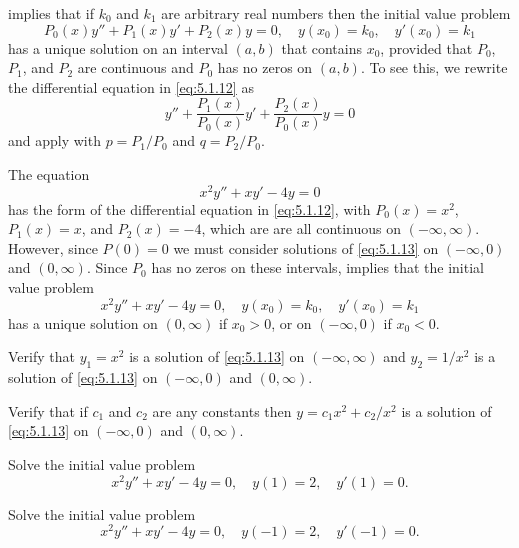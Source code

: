  implies that if $k_0$ and $k_1$ are
arbitrary real numbers then the initial value problem
\begin{equation}\label{eq:5.1.12}
P_0(x)y''+P_1(x)y'+P_2(x)y=0,\quad y(x_0)=k_0,\quad y'(x_0)=k_1
\end{equation}
has a unique solution on an interval $(a,b)$ that contains $x_0$,
provided that $P_0$, $P_1$, and $P_2$ are continuous and $P_0$
has no zeros on $(a,b)$. To see this, we rewrite the differential
equation in  \eqref{eq:5.1.12} as
\[
y''+\frac{P_1(x)}{P_0(x)}y'+\frac{P_2(x)}{P_0(x)}y=0
\]
and apply  with $p=P_1/P_0$ and $q=P_2/P_0$.

\begin{example}\label{example:5.1.3}
The equation
\begin{equation}\label{eq:5.1.13}
x^2y''+xy'-4y=0
\end{equation}
has the form of the differential equation in \eqref{eq:5.1.12}, with
$P_0(x)=x^2$, $P_1(x)=x$, and $P_2(x)=-4$, which are are all
continuous on $(-\infty,\infty)$. However, since $P(0)=0$ we must
consider solutions of \eqref{eq:5.1.13} on $(-\infty,0)$ and $(0,\infty)$.
Since $P_0$ has no zeros on these intervals, 
implies that the initial value problem
\[
x^2y''+xy'-4y=0,\quad y(x_0)=k_0,\quad y'(x_0)=k_1
\]
has a unique solution on $(0,\infty)$ if $x_0>0$, or on $(-\infty,0)$
if $x_0<0$.
\begin{alist}
\item %
Verify that $y_1=x^2$ is a solution of \eqref{eq:5.1.13} on
$(-\infty,\infty)$ and $y_2=1/x^2$ is a solution of \eqref{eq:5.1.13}
on $(-\infty,0)$  and $(0,\infty)$.
\item %
Verify that if $c_1$ and $c_2$ are any constants then
$y=c_1x^2+c_2/x^2$ is a solution of \eqref{eq:5.1.13} on $(-\infty,0)$
and $(0,\infty)$.
\item %
Solve the initial value problem
\begin{equation}\label{eq:5.1.14}
x^2y''+xy'-4y=0,\quad y(1)=2,\quad y'(1)=0.
\end{equation}
\item %
Solve the initial value problem
\begin{equation}\label{eq:5.1.15}
x^2y''+xy'-4y=0,\quad y(-1)=2,\quad y'(-1)=0.
\end{equation}
\end{alist}
\end{example}

